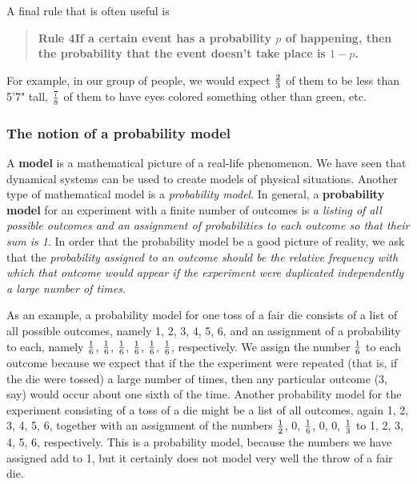 {{{{A final rule that is often useful is
\begin{quote}

{\bf Rule 4\quad If a certain event has a probability $p$ of happening, then the probability that the event doesn't take place is $1-p$.}\label{rule4}
\end{quote}
For example, in our group of people, we would expect ${2 \over 3}$ of them to be less than 5'7" tall, ${7 \over 8}$ of them to have eyes colored something other than green, etc.    

\subsubsection{The notion of a probability model}

A {\bf model} is a mathematical picture of a real-life
phenomenon.  We have seen that dynamical systems can be used to create models of physical situations.  Another type of mathematical model is a {\em probability model}.  In general, a {\bf probability model} for an experiment with a finite number of outcomes is {\em a listing of all possible outcomes and an assignment of probabilities to each outcome so that their sum is 1}.  In  order that the probability model be a good picture of reality, we ask that the {\em probability assigned to an outcome  should be the relative  frequency with which that outcome would appear if the  experiment were duplicated independently a large number of times}.

As an example, a probability model for one toss of a fair die consists of a list of all possible outcomes, namely  1, 2, 3, 4, 5, 6, and an assignment of a probability to each,  namely ${1\over 6}$, ${1\over 6}$, ${1\over 6}$, ${1\over 6}$, ${1\over 6}$, ${1\over 6}$, respectively.  We assign the number ${1\over 6}$ to each outcome because we expect that if the the experiment were repeated  (that is, if the die were tossed) a large number of times, then any particular outcome  (3, say) would occur about one sixth of the time.  Another probability model for the experiment consisting of a toss of a die might be  a list of all outcomes, again 1, 2, 3, 4, 5, 6, together with an  assignment of the numbers ${1\over 2}$, 0, ${1\over 6}$, 0, 0,  ${1\over 3}$ to 1, 2, 3, 4, 5, 6, respectively.   This is a probability  model, because the numbers we have assigned add to 1, but it certainly  does not model very well the throw of a fair die.

}}}}
